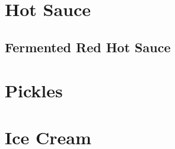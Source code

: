 \chapter{Hot Sauce}
\minitoc
\clearpage
{

	\section[Red Hot Sauce]{Fermented Red Hot Sauce}
	\let\section\subsection
	\let\subsection\subsubsection
	
}

\chapter{Pickles}
\minitoc
\clearpage

{
	\let\section\subsection
	\let\subsection\subsubsection
	
	
	
}

\chapter{Ice Cream}
\minitoc
\clearpage


